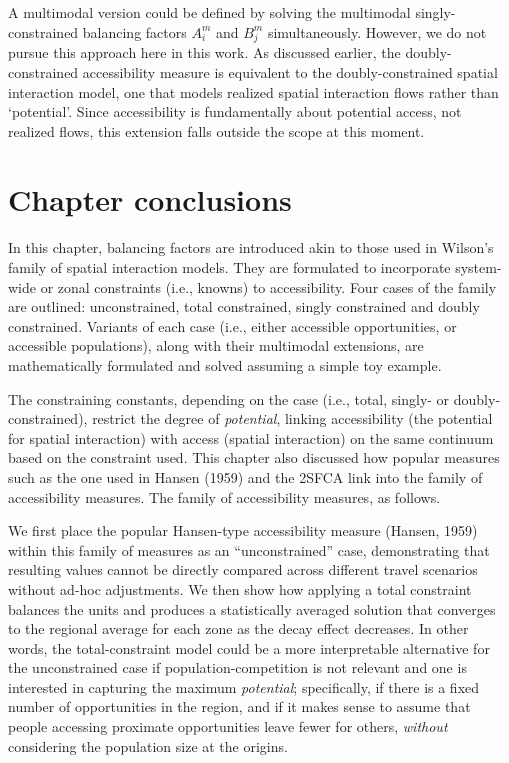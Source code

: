 \documentclass[
11pt, %
oneside, %
english, %
singlespacing, %
]{macthesis} %
\begin{document}
A multimodal version could be defined by solving the multimodal singly-constrained balancing factors \(A_i^m\) and \(B_j^m\) simultaneously. However, we do not pursue this approach here in this work. As discussed earlier, the doubly-constrained accessibility measure is equivalent to the doubly-constrained spatial interaction model, one that models realized spatial interaction flows rather than `potential'. Since accessibility is fundamentally about potential access, not realized flows, this extension falls outside the scope at this moment.

\section{Chapter conclusions}\label{chapter-conclusions}

In this chapter, balancing factors are introduced akin to those used in Wilson's family of spatial interaction models. They are formulated to incorporate system-wide or zonal constraints (i.e., knowns) to accessibility. Four cases of the family are outlined: unconstrained, total constrained, singly constrained and doubly constrained. Variants of each case (i.e., either accessible opportunities, or accessible populations), along with their multimodal extensions, are mathematically formulated and solved assuming a simple toy example.

The constraining constants, depending on the case (i.e., total, singly- or doubly- constrained), restrict the degree of \emph{potential}, linking accessibility (the potential for spatial interaction) with access (spatial interaction) on the same continuum based on the constraint used. This chapter also discussed how popular measures such as the one used in Hansen (1959) and the 2SFCA link into the family of accessibility measures. The family of accessibility measures, as follows.

We first place the popular Hansen-type accessibility measure (Hansen, 1959) within this family of measures as an ``unconstrained'' case, demonstrating that resulting values cannot be directly compared across different travel scenarios without ad-hoc adjustments. We then show how applying a total constraint balances the units and produces a statistically averaged solution that converges to the regional average for each zone as the decay effect decreases. In other words, the total-constraint model could be a more interpretable alternative for the unconstrained case if population-competition is not relevant and one is interested in capturing the maximum \emph{potential}; specifically, if there is a fixed number of opportunities in the region, and if it makes sense to assume that people accessing proximate opportunities leave fewer for others, \emph{without} considering the population size at the origins.
\end{document}
